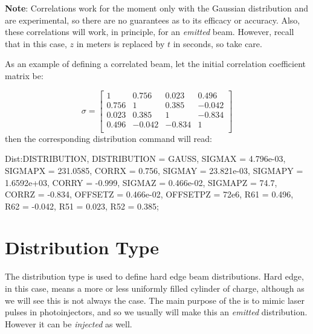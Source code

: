 \textbf{Note}: Correlations work for the moment only with the Gaussian distribution and are experimental, so there are
no guarantees as to its efficacy or accuracy. Also, these correlations will work, in principle, for an \emph{emitted} beam.
However, recall that in this case, $z$ in meters is replaced by $t$ in seconds, so take care.

As an example of defining a correlated beam, let the initial correlation coefficient matrix be:

\begin{equation*}
\sigma= \left[
\begin{array}{cccc}
1      &0.756  &0.023    &0.496\\
0.756  &1      &0.385    &-0.042\\
0.023  &0.385  &1        &-0.834\\
0.496  &-0.042 &-0.834   &1\\
\end{array}
\right]
\end{equation*}
then the corresponding distribution command will read:

\begin{example}
Dist:DISTRIBUTION, DISTRIBUTION = GAUSS,
                   SIGMAX = 4.796e-03,
                   SIGMAPX = 231.0585,
                   CORRX = 0.756,
                   SIGMAY = 23.821e-03,
                   SIGMAPY = 1.6592e+03,
                   CORRY = -0.999,
                   SIGMAZ = 0.466e-02,
                   SIGMAPZ = 74.7,
                   CORRZ = -0.834,
                   OFFSETZ = 0.466e-02,
                   OFFSETPZ = 72e6,
                   R61 = 0.496,
                   R62 = -0.042,
                   R51 = 0.023,
                   R52 = 0.385;
\end{example}

\section{ Distribution Type}
\label{sec:flattopdisttype}
\FloatBarrier

The  distribution type is used to define hard edge beam distributions. Hard edge, in this case, means
a more or less uniformly filled cylinder of charge, although as we will see this is not always the case. The main purpose
of the  is to mimic laser pulses in photoinjectors, and so we usually will make this an \emph{emitted}
distribution. However it can be \emph{injected} as well.

